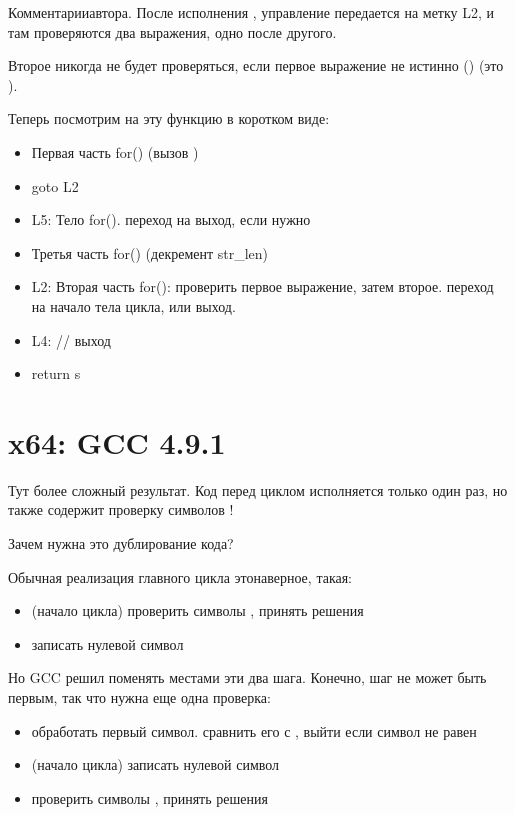 

Комментарии\EMDASH{}автора.
После исполнения \strlen{}, управление передается на метку L2,
и там проверяются два выражения, одно после другого.

Второе никогда не будет проверяться, если первое выражение не истинно ()
(это ).

Теперь посмотрим на эту функцию в коротком виде:

\begin{itemize}
\item Первая часть for() (вызов \strlen{})
\item goto L2
\item L5: Тело for(). переход на выход, если нужно
\item Третья часть for() (декремент str\_len)
\item L2: Вторая часть for(): проверить первое выражение, затем второе. 
переход на начало тела цикла, или выход.

\item L4: // выход
\item return s
\end{itemize}

\section{x64: \Optimizing GCC 4.9.1}
\label{string_trim_GCC_x64_O3}



Тут более сложный результат.
Код перед циклом исполняется только один раз, но также содержит проверку символов \CRLF{}!

Зачем нужна это дублирование кода?

Обычная реализация главного цикла это\EMDASH{}наверное, такая:

\begin{itemize}
\item (начало цикла) проверить символы \CRLF{}, принять решения

\item записать нулевой символ
\end{itemize}

Но GCC решил поменять местами эти два шага. 
Конечно, шаг  не может быть первым, так что нужна еще одна
проверка:


\begin{itemize}
\item обработать первый символ. сравнить его с \CRLF{}, выйти если символ не равен \CRLF{}

\item (начало цикла) записать нулевой символ

\item проверить символы \CRLF{}, принять решения

\end{itemize}


